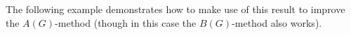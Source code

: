 \documentclass[12pt,a4paper]{article}
\let\\=\cr
\theoremstyle{definition}
\theoremstyle{remark}
\newtheorem{ex}[thm]{Example}
\theoremstyle{custthm}
\begin{document}
The following example demonstrates how to make use of this result to improve the $A(G)$-method (though in this case the $B(G)$-method also works).



%
%
%


\end{document}
